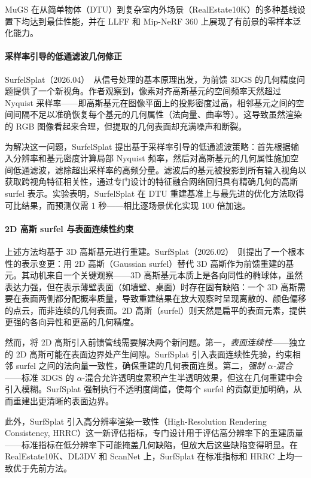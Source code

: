MuGS 在从简单物体（DTU）到复杂室内外场景（RealEstate10K）的多种基线设置下均达到最佳性能，并在 LLFF 和 Mip-NeRF 360 上展现了有前景的零样本泛化能力。

\paragraph{采样率引导的低通滤波几何修正}

SurfelSplat（2026.04）~\cite{2604_08370}从信号处理的基本原理出发，为前馈 3DGS 的几何精度问题提供了一个新视角。作者观察到，像素对齐高斯基元的空间频率天然超过 Nyquist 采样率——即高斯基元在图像平面上的投影密度过高，相邻基元之间的空间间隔不足以准确恢复每个基元的几何属性（法向量、曲率等）。这导致虽然渲染的 RGB 图像看起来合理，但提取的几何表面却充满噪声和断裂。

为解决这一问题，SurfelSplat 提出基于采样率引导的低通滤波策略：首先根据输入分辨率和基元密度计算局部 Nyquist 频率，然后对高斯基元的几何属性施加空间低通滤波，滤除超出采样率的高频分量。滤波后的基元被投影到所有输入视角以获取跨视角特征相关性，通过专门设计的特征融合网络回归具有精确几何的高斯 surfel 表示。实验表明，SurfelSplat 在 DTU 重建基准上与最先进的优化方法取得可比结果，而预测仅需 1 秒——相比逐场景优化实现 100 倍加速。

\paragraph{2D 高斯 surfel 与表面连续性约束}

上述方法均基于 3D 高斯基元进行重建。SurfSplat（2026.02）~\cite{2602_02000}则提出了一个根本性的表示变更：用 2D 高斯（Gaussian surfel）替代 3D 高斯作为前馈重建的基元。其动机来自一个关键观察——3D 高斯基元本质上是各向同性的椭球体，虽然表达力强，但在表示薄壁表面（如墙壁、桌面）时存在固有缺陷：一个 3D 高斯需要在表面两侧都分配概率质量，导致重建结果在放大观察时呈现离散的、颜色偏移的点云，而非连续的几何表面。2D 高斯（surfel）则天然是扁平的表面元素，提供更强的各向异性和更高的几何精度。

然而，将 2D 高斯引入前馈管线需要解决两个新问题。第一，\emph{表面连续性}——独立的 2D 高斯可能在表面边界处产生间隙。SurfSplat 引入表面连续性先验，约束相邻 surfel 之间的法向量一致性，确保重建的几何表面连贯。第二，\emph{强制 $\alpha$-混合}——标准 3DGS 的 $\alpha$-混合允许透明度累积产生半透明效果，但这在几何重建中会引入模糊。SurfSplat 强制执行不透明度阈值，使每个 surfel 的贡献更加明确，从而重建出更清晰的表面边界。

此外，SurfSplat 引入高分辨率渲染一致性（High-Resolution Rendering Consistency, HRRC）这一新评估指标，专门设计用于评估高分辨率下的重建质量——标准指标在低分辨率下可能掩盖几何缺陷，但放大后这些缺陷变得明显。在 RealEstate10K、DL3DV 和 ScanNet 上，SurfSplat 在标准指标和 HRRC 上均一致优于先前方法。

